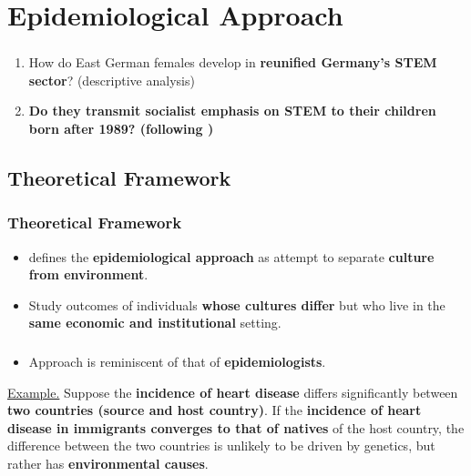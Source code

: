 \documentclass[11pt, aspectratio=1610, xcolor={dvipsnames}]{beamer}
\newcommand{\highlight}[1]{\textbf{\textcolor{PineGreen}{#1}}}
\begin{document}
	\section{Epidemiological Approach}
	\begin{frame}
		\frametitle{}
		
		\begin{enumerate}
			\item How do East German females develop in \highlight{reunified Germany's STEM sector}? (descriptive analysis)
			\item \textbf{Do they \highlight{transmit} socialist emphasis on STEM to their children born after 1989? (following \cite{Fernandez2011})}
		\end{enumerate}
		
	\end{frame}
	
	\subsection{Theoretical Framework}
	\begin{frame}
		\frametitle{Theoretical Framework}
		
		\begin{itemize}
			\item \cite{Fernandez2011} defines the \highlight{epidemiological approach} as attempt to separate \highlight{culture from environment}.
			\item Study outcomes of individuals \highlight{whose cultures differ} but who live in the \highlight{same economic and institutional} setting.
		\end{itemize}
		
	\end{frame}
	
	\begin{frame}
		\frametitle{}
		
		\begin{itemize}
			\item Approach is reminiscent of that of \highlight{epidemiologists}.
		\end{itemize}
		
		\vspace{8mm}
		
		\begin{minipage}{\linewidth}
			\textcolor{PineGreen}{\underline{Example.}} Suppose the \highlight{incidence of heart disease} differs significantly between \highlight{two countries (source and host country)}. If the \highlight{incidence of heart disease in immigrants converges to that of natives} of the host country, the difference between the two countries is unlikely to be driven by genetics, but rather has \highlight{environmental causes}.
		\end{minipage}
		
	\end{frame}
	
\end{document}
